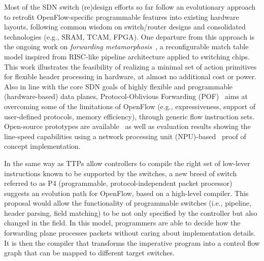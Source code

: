 Most of the SDN switch (re)design efforts so far follow an evolutionary approach to retrofit 
OpenFlow-specific programmable features into existing hardware layouts, following common wisdom 
on switch/router designs and consolidated technologies (e.g., SRAM, TCAM, FPGA). One departure from 
this approach is the ongoing work on \textit{forwarding metamorphosis}~\cite{bosshart2013-1}, 
a reconfigurable match table model inspired from RISC-like pipeline architecture applied to switching 
chips. This work illustrates the feasibility of realizing a minimal set of action primitives for flexible 
header processing in hardware, at almost no additional cost or power. Also in line with the core SDN goals 
of highly flexible and programmable (hardware-based) data planes, Protocol-Oblivious Forwarding (POF)~\cite{song2013-1} aims at overcoming some of the limitations of OpenFlow (e.g., expressiveness, 
support of user-defined protocols, memory efficiency), through generic flow instruction sets.
Open-source prototypes are available~\cite{song2013} as well as evaluation 
results showing the line-speed capabilities using a network processing unit (NPU)-based~\cite{Hauger2009} proof of concept implementation. 

In the same way as TTPs allow controllers to compile the right set of low-lever instructions known to be supported by the switches, a new breed of switch referred to as P4 (programmable, protocol-independent packet
processor)~\cite{bosshart2013} suggests an evolution path for OpenFlow, based on a high-level compiler. 
This proposal would allow the functionality of programmable switches (i.e., pipeline, header parsing, field matching) to be not only specified by the controller but also changed in the field.
In this model, programmers are able to decide how the forwarding plane processes packets without caring about implementation details.
It is then the compiler that transforms the imperative program into a control flow graph that can be mapped to different target switches. 


